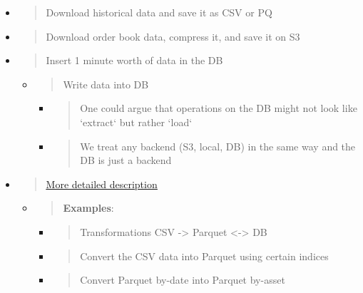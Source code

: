 \documentclass[11pt, reqno]{amsart}
\begin{document}
\begin{itemize}
\item
  \begin{quote}
  Download historical data and save it as CSV or PQ
  \end{quote}
\item
  \begin{quote}
  Download order book data, compress it, and save it on S3
  \end{quote}
\item
  \begin{quote}
  Insert 1 minute worth of data in the DB
  \end{quote}

  \begin{itemize}
  \item
    \begin{quote}
    Write data into DB
    \end{quote}

    \begin{itemize}
    \item
      \begin{quote}
      One could argue that operations on the DB might not look like
      `extract` but rather `load`
      \end{quote}
    \item
      \begin{quote}
      We treat any backend (S3, local, DB) in the same way and the DB is
      just a backend
      \end{quote}
    \end{itemize}
  \end{itemize}
\item
  \begin{quote}
  \href{https://docs.google.com/document/d/1EH7RqeTdVCXDcrCKPm0PvrtftTA11X9V-AT7F20V7T4/edit\#heading=h.t1ycoe6irr95}{\ul{More
  detailed description}}
  \end{quote}

  \begin{itemize}
  \item
    \begin{quote}
    \textbf{Examples}:
    \end{quote}

    \begin{itemize}
    \item
      \begin{quote}
      Transformations CSV -\textgreater{} Parquet
      \textless-\textgreater{} DB
      \end{quote}
    \item
      \begin{quote}
      Convert the CSV data into Parquet using certain indices
      \end{quote}
    \item
      \begin{quote}
      Convert Parquet by-date into Parquet by-asset
      \end{quote}
    \end{itemize}
  \end{itemize}
\end{itemize}
\end{document}
